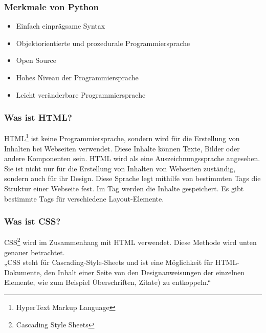 \subsubsection{Merkmale von Python} 
\begin{itemize}
	\item Einfach einprägsame Syntax
\end{itemize}
\begin{itemize}
	\item Objektorientierte und prozedurale Programmiersprache
\end{itemize}
\begin{itemize}
	\item Open Source 
\end{itemize}
\begin{itemize}
	\item Hohes Niveau der Programmiersprache
\end{itemize}
\begin{itemize}
	\item Leicht veränderbare Programmiersprache \cite{50_python}
\end{itemize}
\subsubsection{Was ist HTML?} 
HTML\footnote{HyperText Markup Language} ist keine Programmiersprache, sondern wird für die Erstellung von Inhalten bei Webseiten verwendet. Diese Inhalte können Texte, Bilder oder andere Komponenten sein. HTML wird als eine Auszeichnungssprache angesehen. Sie ist nicht nur für die Erstellung von Inhalten von Webseiten zuständig, sondern auch für ihr Design. Diese Sprache legt mithilfe von bestimmten Tags die Struktur einer Webseite fest. Im Tag werden die Inhalte gespeichert. Es gibt bestimmte Tags für verschiedene Layout-Elemente. \cite{50_html} %
\subsubsection{Was ist CSS?} 
CSS\footnote{Cascading Style Sheets} wird im Zusammenhang mit HTML verwendet. Diese Methode wird unten genauer betrachtet. \\
„CSS steht für Cascading-Style-Sheets und ist eine Möglichkeit für HTML-Dokumente, den Inhalt einer Seite von den Designanweisungen der einzelnen Elemente, wie zum Beispiel Überschriften, Zitate) zu entkoppeln.“ \cite{50_css}
